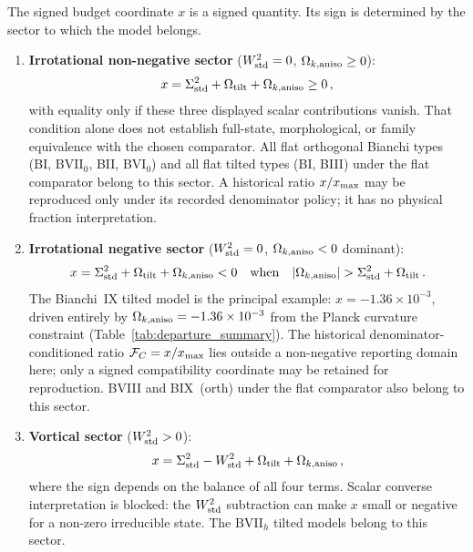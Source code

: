 \begin{proposition}
\label{prop:x-sign}
The signed budget coordinate $x$ is a signed quantity.  Its sign is determined by
the sector to which the model belongs.
\begin{enumerate}
\item[\emph{(i)}]
  \textbf{Irrotational non-negative sector} ($W^2_{\mathrm{std}} = 0$,\;
  $\Omega_{k,\mathrm{aniso}} \geq 0$):
  \begin{equation}\label{eq:x-irrot-pos}
  x = \Sigma^2_{\mathrm{std}} + \Omega_{\mathrm{tilt}} + \Omega_{k,\mathrm{aniso}} \geq 0\,,
  \end{equation}
  with equality only if these three displayed scalar contributions
  vanish.  That condition alone does not establish full-state,
  morphological, or family equivalence with the chosen comparator.
  All flat orthogonal Bianchi types
  (BI, BVII$_0$, BII, BVI$_0$) and all flat tilted types (BI,
  BIII) under the flat comparator belong to this sector.
  A historical ratio $x/x_{\max}$ may be reproduced only under its
  recorded denominator policy; it has no physical fraction
  interpretation.

\item[\emph{(ii)}]
  \textbf{Irrotational negative sector} ($W^2_{\mathrm{std}} = 0$,\;
  $\Omega_{k,\mathrm{aniso}} < 0$ dominant):
  \begin{equation}\label{eq:x-irrot-neg}
  x = \Sigma^2_{\mathrm{std}} + \Omega_{\mathrm{tilt}} + \Omega_{k,\mathrm{aniso}} < 0
  \quad\text{when}\quad
  |\Omega_{k,\mathrm{aniso}}| > \Sigma^2_{\mathrm{std}} + \Omega_{\mathrm{tilt}}\,.
  \end{equation}
  The Bianchi~IX tilted model is the principal example:
  $x = -1.36 \times 10^{-3}$, driven entirely by
  $\Omega_{k,\mathrm{aniso}} = -1.36 \times 10^{-3}$ from the Planck curvature
  constraint (Table~\ref{tab:departure_summary}).  The historical
  denominator-conditioned ratio $\mathcal{F}_C=x/x_{\max}$ lies outside a
  non-negative reporting domain here; only a signed compatibility
  coordinate may be retained for reproduction.  BVIII and BIX~(orth)
  under the flat comparator also belong to this sector.

\item[\emph{(iii)}]
  \textbf{Vortical sector} ($W^2_{\mathrm{std}} > 0$):
  \begin{equation}\label{eq:x-vort}
  x = \Sigma^2_{\mathrm{std}} - W^2_{\mathrm{std}} + \Omega_{\mathrm{tilt}} + \Omega_{k,\mathrm{aniso}}\,,
  \end{equation}
  where the sign depends on the balance of all four terms.
  Scalar converse interpretation is blocked: the $W^2_{\mathrm{std}}$ subtraction
  can make $x$ small or negative for a non-zero irreducible state.  The
  BVII$_h$ tilted models belong to this sector.
\end{enumerate}
\end{proposition}

